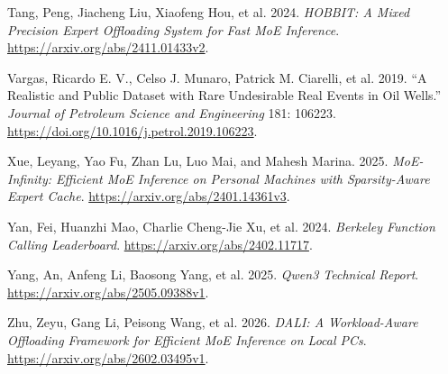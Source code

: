 \documentclass[
  10pt,
  letterpaper,
  10pt]{article}
\newlength{\cslhangindent}
\newenvironment{CSLReferences}[2] %
 {\begin{list}{}{%
  \setlength{\itemindent}{0pt}
  \setlength{\leftmargin}{0pt}
  \setlength{\parsep}{0pt}
  \ifodd #1
   \setlength{\leftmargin}{\cslhangindent}
   \setlength{\itemindent}{-1\cslhangindent}
  \fi
  \setlength{\itemsep}{#2\baselineskip}}}
 {\end{list}}
\begin{document}
\begin{CSLReferences}{1}{1}
Tang, Peng, Jiacheng Liu, Xiaofeng Hou, et al. 2024. \emph{{HOBBIT}: A
Mixed Precision Expert Offloading System for Fast {MoE} Inference}.
\url{https://arxiv.org/abs/2411.01433v2}.

Vargas, Ricardo E. V., Celso J. Munaro, Patrick M. Ciarelli, et al.
2019. {``A Realistic and Public Dataset with Rare Undesirable Real
Events in Oil Wells.''} \emph{Journal of Petroleum Science and
Engineering} 181: 106223.
\url{https://doi.org/10.1016/j.petrol.2019.106223}.

Xue, Leyang, Yao Fu, Zhan Lu, Luo Mai, and Mahesh Marina. 2025.
\emph{{MoE-Infinity}: Efficient {MoE} Inference on Personal Machines
with Sparsity-Aware Expert Cache}.
\url{https://arxiv.org/abs/2401.14361v3}.

{Yan, Fei, Huanzhi Mao, Charlie Cheng-Jie Xu, et al.} 2024.
\emph{Berkeley Function Calling Leaderboard}.
\url{https://arxiv.org/abs/2402.11717}.

{Yang, An, Anfeng Li, Baosong Yang, et al.} 2025. \emph{{Qwen3}
Technical Report}. \url{https://arxiv.org/abs/2505.09388v1}.

Zhu, Zeyu, Gang Li, Peisong Wang, et al. 2026. \emph{{DALI}: A
Workload-Aware Offloading Framework for Efficient {MoE} Inference on
Local PCs}. \url{https://arxiv.org/abs/2602.03495v1}.

\end{CSLReferences}
\end{document}
